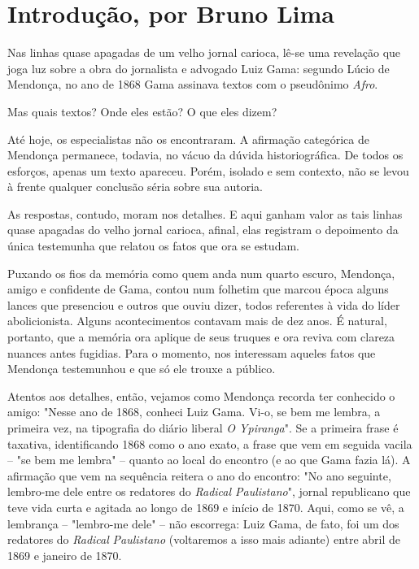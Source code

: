 \chapter{Introdução, por Bruno Lima}

Nas linhas quase apagadas de um velho jornal carioca, lê-se uma
revelação que joga luz sobre a obra do jornalista e advogado Luiz Gama:
segundo Lúcio de Mendonça, no ano de 1868 Gama assinava textos com o
pseudônimo \emph{Afro}.

Mas quais textos? Onde eles estão? O que eles dizem?

Até hoje, os especialistas não os encontraram. A afirmação categórica de
Mendonça permanece, todavia, no vácuo da dúvida historiográfica. De
todos os esforços, apenas um texto apareceu. Porém, isolado e sem
contexto, não se levou à frente qualquer conclusão séria sobre sua
autoria.

As respostas, contudo, moram nos detalhes. E aqui ganham valor as tais
linhas quase apagadas do velho jornal carioca, afinal, elas registram o
depoimento da única testemunha que relatou os fatos que ora se estudam.

Puxando os fios da memória como quem anda num quarto escuro, Mendonça,
amigo e confidente de Gama, contou num folhetim que marcou época alguns
lances que presenciou e outros que ouviu dizer, todos referentes à vida
do líder abolicionista. Alguns acontecimentos contavam mais de dez anos.
É natural, portanto, que a memória ora aplique de seus truques e ora
reviva com clareza nuances antes fugidias. Para o momento, nos
interessam aqueles fatos que Mendonça testemunhou e que só ele trouxe a
público.

Atentos aos detalhes, então, vejamos como Mendonça recorda ter conhecido
o amigo: "Nesse ano de 1868, conheci Luiz Gama. Vi-o, se bem me lembra,
a primeira vez, na tipografia do diário liberal \emph{O Ypiranga}". Se a
primeira frase é taxativa, identificando 1868 como o ano exato, a frase
que vem em seguida vacila -- "se bem me lembra" -- quanto ao local do
encontro (e ao que Gama fazia lá). A afirmação que vem na sequência
reitera o ano do encontro: "No ano seguinte, lembro-me dele entre os
redatores do \emph{Radical Paulistano}", jornal republicano que teve
vida curta e agitada ao longo de 1869 e início de 1870. Aqui, como se
vê, a lembrança -- "lembro-me dele" -- não escorrega: Luiz Gama, de
fato, foi um dos redatores do \emph{Radical} \emph{Paulistano}
(voltaremos a isso mais adiante) entre abril de 1869 e janeiro de 1870.

